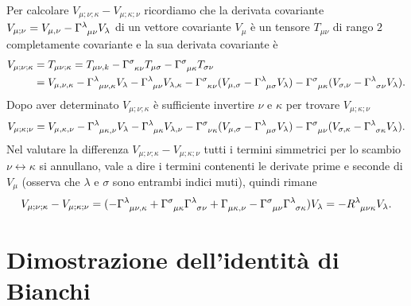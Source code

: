 Per calcolare $V_{\mu;\nu;\kappa} - V_{\mu;\kappa;\nu}$ ricordiamo che la
derivata covariante
$V_{\mu;\nu} = V_{\mu,\nu} - \tensor{\Gamma}{^{\lambda}_{\mu\nu}} V_{\lambda}$
di un vettore covariante $V_{\mu}$ è un tensore $T_{\mu\nu}$ di rango $2$
completamente covariante e la sua derivata covariante è
\begin{equation}
  \begin{split}
    V_{\mu;\nu;\kappa} &= T_{\mu\nu;\kappa} = T_{\mu\nu,k} -
    \tensor{\Gamma}{^{\sigma}_{\kappa\nu}} T_{\mu\sigma} -
    \tensor{\Gamma}{^{\sigma}_{\mu\kappa}} T_{\sigma\nu} \\
    &= V_{\mu,\nu,\kappa} -
    \tensor{\Gamma}{^{\lambda}_{\mu\nu,\kappa}}V_{\lambda} -
    \tensor{\Gamma}{^{\lambda}_{\mu\nu}} V_{\lambda,\kappa} -
    \tensor{\Gamma}{^{\sigma}_{\kappa\nu}} (V_{\mu,\sigma} -
    \tensor{\Gamma}{^{\lambda}_{\mu\sigma}} V_{\lambda}) -
    \tensor{\Gamma}{^{\sigma}_{\mu\kappa}} (V_{\sigma,\nu} -
    \tensor{\Gamma}{^{\lambda}_{\sigma\nu}} V_{\lambda}).
  \end{split}
\end{equation}
Dopo aver determinato $V_{\mu;\nu;\kappa}$ è sufficiente invertire $\nu$ e
$\kappa$ per trovare $V_{\mu;\kappa;\nu}$
\begin{equation}
  V_{\mu;\kappa;\nu} = V_{\mu,\kappa,\nu} -
    \tensor{\Gamma}{^{\lambda}_{\mu\kappa,\nu}}V_{\lambda} -
    \tensor{\Gamma}{^{\lambda}_{\mu\kappa}} V_{\lambda,\nu} -
    \tensor{\Gamma}{^{\sigma}_{\nu\kappa}} (V_{\mu,\sigma} -
    \tensor{\Gamma}{^{\lambda}_{\mu\sigma}} V_{\lambda}) -
    \tensor{\Gamma}{^{\sigma}_{\mu\nu}} (V_{\sigma,\kappa} -
    \tensor{\Gamma}{^{\lambda}_{\sigma\kappa}} V_{\lambda}).
\end{equation}
Nel valutare la differenza $V_{\mu;\nu;\kappa} - V_{\mu;\kappa;\nu}$ tutti i
termini simmetrici per lo scambio $\nu \leftrightarrow \kappa$ si annullano,
vale a dire i termini contenenti le derivate prime e seconde di $V_{\mu}$
(osserva che $\lambda$ e $\sigma$ sono entrambi indici muti), quindi rimane
\begin{equation}
  V_{\mu;\nu;\kappa} - V_{\mu;\kappa;\nu} =
  (-\tensor{\Gamma}{^{\lambda}_{\mu\nu,\kappa}} +
  \tensor{\Gamma}{^{\sigma}_{\mu\kappa}} \tensor{\Gamma}{^{\lambda}_{\sigma\nu}}
  + \tensor{\Gamma}{_{\mu\kappa,\nu}} - \tensor{\Gamma}{^{\sigma}_{\mu\nu}}
  \tensor{\Gamma}{^{\lambda}_{\sigma\kappa}}) V_{\lambda} =
  -\tensor{R}{^{\lambda}_{\mu\nu\kappa}} V_{\lambda}.
\end{equation}

\section{Dimostrazione dell'identità di Bianchi}
\label{sec:dimostr-identita-bianchi}

